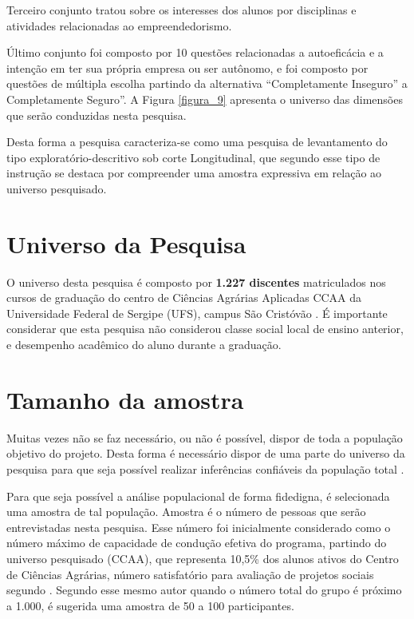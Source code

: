 Terceiro conjunto tratou sobre os interesses dos alunos por disciplinas e atividades relacionadas ao empreendedorismo.

Último conjunto foi composto por 10 questões relacionadas a autoeficácia e a intenção em ter sua própria empresa ou ser autônomo, e foi composto por questões de múltipla escolha partindo da alternativa “Completamente Inseguro” a Completamente Seguro”. A Figura \ref{figura_9} apresenta o universo das dimensões que serão conduzidas nesta pesquisa.

Desta forma a pesquisa caracteriza-se como uma pesquisa de levantamento  do tipo exploratório-descritivo sob corte Longitudinal, que segundo  esse tipo de instrução se destaca por compreender uma amostra expressiva em relação ao universo pesquisado.

\section{Universo da Pesquisa}

O universo desta pesquisa é composto por \textbf{1.227 discentes} matriculados nos cursos de graduação do centro de Ciências Agrárias Aplicadas CCAA da Universidade Federal de Sergipe (UFS), campus São Cristóvão \cite{andrade_ufs_2019}. É importante considerar que esta pesquisa não considerou classe social local de ensino anterior, e desempenho acadêmico do aluno durante a graduação.


\section{Tamanho da amostra}

Muitas  vezes  não  se  faz necessário,  ou não é possível, dispor de toda a população objetivo do projeto. Desta forma é necessário dispor de uma parte do universo da pesquisa para que seja possível realizar inferências confiáveis da população total \cite{marino_manual_2003}.

Para que seja possível a análise populacional de forma fidedigna, é selecionada uma amostra de tal população. Amostra é o número de pessoas que serão entrevistadas nesta pesquisa. Esse número foi inicialmente considerado como o número máximo de capacidade de condução efetiva do programa, partindo do universo pesquisado (CCAA), que  representa 10,5\% dos alunos ativos do Centro de Ciências Agrárias, número satisfatório para avaliação de projetos sociais segundo . Segundo esse mesmo autor quando o número total do grupo é próximo a 1.000, é sugerida uma amostra de 50 a 100 participantes.

